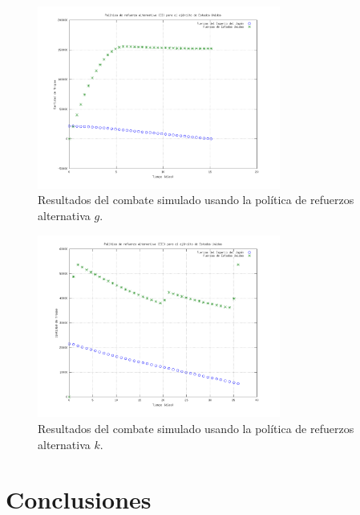 \documentclass{sig-alternate}
\begin{document}
\begin{figure}[h]
\begin{center}
\includegraphics[width=8cm]{reinforce3.png}
\caption{\label{fig:reinforce3}Resultados del combate simulado usando la política de refuerzos alternativa $g$.}
\end{center}
\end{figure}


\begin{figure}[h]
\begin{center}
\includegraphics[width=8cm]{reinforce4.png}
\caption{\label{fig:reinforce4}Resultados del combate simulado usando la política de refuerzos alternativa $k$.}
\end{center}
\end{figure}


\section{Conclusiones}
\end{document}
